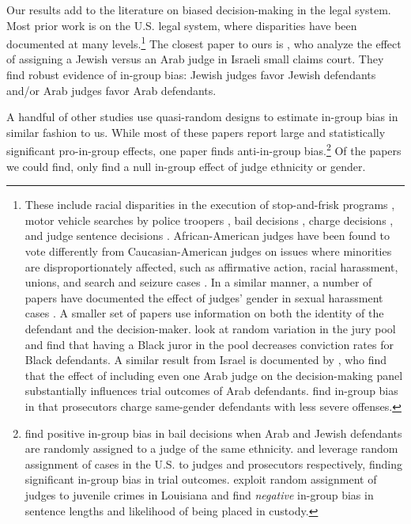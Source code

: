 \documentclass[12pt,english]{article}
\begin{document}
Our results add to the literature on biased decision-making in the legal system. Most prior work is on the U.S. legal system, where disparities have been documented at many levels.\footnote{These include racial disparities in the execution of stop-and-frisk programs \citep{GoelRaoShroffothers2016TAoAS}, motor vehicle searches by police troopers \citep{anwar2006alternative}, bail decisions \citep{arnold2018racial,arnold2022measuring}, charge decisions \citep{RehaviStarr2014JoPE}, and judge sentence decisions \citep{Mustard2001TJoLaE,AbramsBertrandMullainathan2012TJoLS, AlesinaLaFerrara2014TAER, kastellec2013racial}. African-American judges have been found to vote differently from Caucasian-American judges on issues where minorities are disproportionately affected, such as affirmative action, racial harassment, unions, and search and seizure cases \citep{Scherer2004PSQ,ChewKelley2008WUR,Kastellec2011PRQ}. In a similar manner, a number of papers have documented the effect of judges' gender in sexual harassment cases \citep{BoydEpsteinMartin2010AJoPS,Peresie2005TYLJ}. A smaller set of papers use information on both the identity of the defendant and the decision-maker. \citet{AnwarBayerHjalmarsson2012TQJoE} look at random variation in the jury pool and find that having a Black juror in the pool decreases conviction rates for Black defendants. A similar result from Israel is documented by \citet{grossman2016descriptive}, who find that the effect of including even one Arab judge on the decision-making panel substantially influences trial outcomes of Arab defendants. \cite{Didwania2018CLE} find in-group bias in that prosecutors charge same-gender defendants with less severe offenses.} The closest paper to ours is \citet{ShayoZussman2011QJE}, who analyze the effect of assigning a Jewish versus an Arab judge in Israeli small claims court. They find robust evidence of in-group bias: Jewish judges favor Jewish defendants and/or Arab judges favor Arab defendants.

A handful of other studies use quasi-random designs to estimate in-group bias in similar fashion to us. While most of these papers report large and statistically significant pro-in-group effects, one paper finds anti-in-group bias.\footnote{\citet{gazal2010let} find positive in-group bias in bail decisions when Arab and Jewish defendants are randomly assigned to a judge of the same ethnicity. \citet{knepper2018shadow} and \citet{sloane2019racial} leverage random assignment of cases in the U.S. to judges and prosecutors respectively, finding significant in-group bias in trial outcomes. \citet{depew2017judges} exploit random assignment of judges to juvenile crimes in Louisiana and find \textit{negative} in-group bias in sentence lengths and likelihood of being placed in custody.} Of the papers we could find, only \citet{lim2016judges} find a null in-group effect of judge ethnicity or gender.
\end{document}
